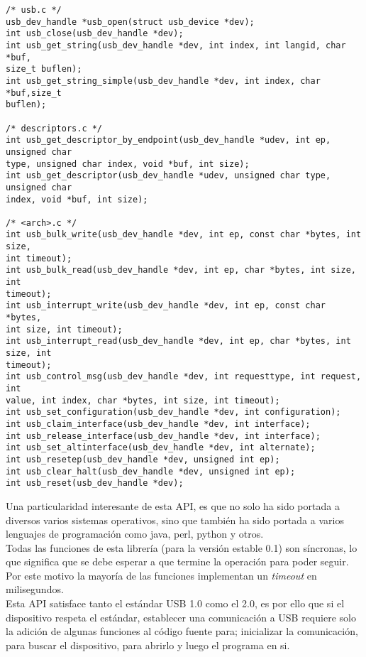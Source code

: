 \begin{lstlisting}
/* usb.c */
usb_dev_handle *usb_open(struct usb_device *dev);
int usb_close(usb_dev_handle *dev);
int usb_get_string(usb_dev_handle *dev, int index, int langid, char *buf,
size_t buflen);
int usb_get_string_simple(usb_dev_handle *dev, int index, char *buf,size_t
buflen);

/* descriptors.c */
int usb_get_descriptor_by_endpoint(usb_dev_handle *udev, int ep, unsigned char
type, unsigned char index, void *buf, int size);
int usb_get_descriptor(usb_dev_handle *udev, unsigned char type, unsigned char
index, void *buf, int size);

/* <arch>.c */
int usb_bulk_write(usb_dev_handle *dev, int ep, const char *bytes, int size,
int timeout);
int usb_bulk_read(usb_dev_handle *dev, int ep, char *bytes, int size, int
timeout);
int usb_interrupt_write(usb_dev_handle *dev, int ep, const char *bytes,
int size, int timeout);
int usb_interrupt_read(usb_dev_handle *dev, int ep, char *bytes, int size, int
timeout);
int usb_control_msg(usb_dev_handle *dev, int requesttype, int request, int
value, int index, char *bytes, int size, int timeout);
int usb_set_configuration(usb_dev_handle *dev, int configuration);
int usb_claim_interface(usb_dev_handle *dev, int interface);
int usb_release_interface(usb_dev_handle *dev, int interface);
int usb_set_altinterface(usb_dev_handle *dev, int alternate);
int usb_resetep(usb_dev_handle *dev, unsigned int ep);
int usb_clear_halt(usb_dev_handle *dev, unsigned int ep);
int usb_reset(usb_dev_handle *dev);
\end{lstlisting}


Una particularidad interesante de esta API, es que no solo ha sido portada a
diversos varios sistemas operativos, sino que tambi\'en ha sido portada a
varios lenguajes de programaci\'on como java, perl, python y otros.\\

Todas las funciones de esta librer\'ia (para la versi\'on estable 0.1) son
s\'incronas, lo que significa que se debe esperar a que termine la operaci\'on
para poder seguir. Por este motivo la mayor\'ia de las funciones implementan un
\emph{timeout} en milisegundos.\\

Esta API satisface tanto el est\'andar USB 1.0 como el 2.0, es por ello que si
el dispositivo respeta el est\'andar, establecer una comunicaci\'on a USB
requiere solo la adici\'on de algunas funciones al c\'odigo fuente para;
inicializar la comunicaci\'on, para buscar el dispositivo, para abrirlo y
luego el programa en si.




